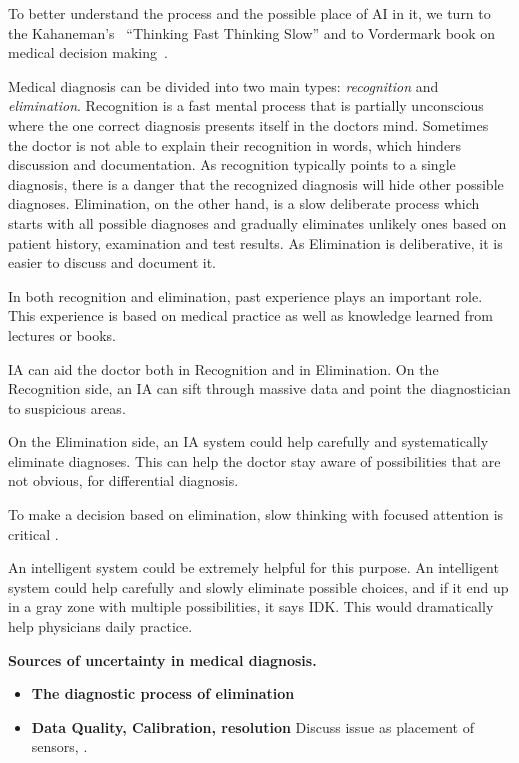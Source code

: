 \documentclass[11pt]{pnas-new}
\begin{document}
To better understand the process and the possible place of AI in it,
we turn to the Kahaneman's~\cite{kahneman2011thinking} ``Thinking Fast Thinking Slow'' and
to Vordermark book on medical decision
making~\cite{vordermark2019introduction}.

Medical diagnosis can be divided into two main types: {\em
  recognition} and {\em elimination}. Recognition is a fast mental
process that is partially unconscious where the one correct diagnosis presents itself in the doctors mind.  Sometimes the doctor is not able to explain their recognition in words, which hinders discussion and documentation.  As recognition 
typically points to a single diagnosis, there is a danger that the
recognized diagnosis will hide other possible diagnoses.
Elimination, on the other hand, is a slow deliberate process  which starts with all possible diagnoses and gradually eliminates
unlikely ones based on patient history, examination and test
results. As Elimination is deliberative, it is easier to discuss and
document it.

In both recognition and elimination, past experience plays an important role. This experience is based on medical practice as well as knowledge learned from lectures or books. 

IA can aid the doctor both in Recognition and in Elimination. On the Recognition side, an IA can sift through massive data and point the diagnostician to suspicious areas.

On the Elimination side, an IA system could help carefully and systematically
eliminate diagnoses. This can help the doctor stay aware of possibilities that are not obvious, for differential diagnosis.


\iffalse
To make a decision based
on elimination, slow thinking with focused attention is critical
\cite{michel2020thinking}. 

An intelligent system could be extremely helpful for this
purpose. An intelligent system could help carefully and slowly
eliminate possible choices, and if it end up in a gray zone with
multiple possibilities, it says IDK. This would dramatically help
physicians daily practice.


{\bf Sources of uncertainty in medical diagnosis.}
\begin{itemize}
  \item{\bf The diagnostic process of elimination}
  \item{\bf Data Quality, Calibration, resolution} Discuss issue as placement of sensors, .
  \end{itemize}
\end{document}
